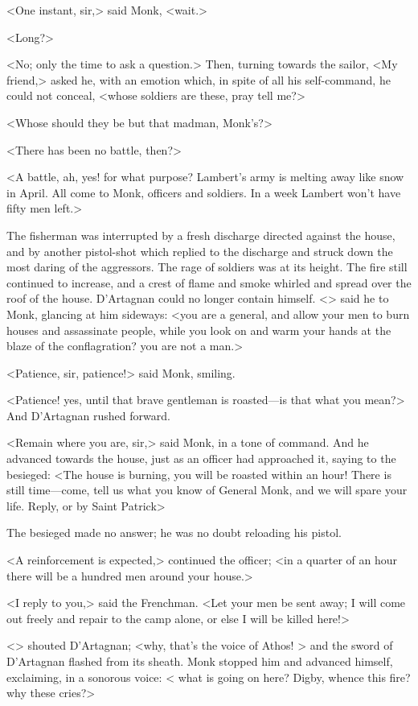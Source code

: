 <One instant, sir,> said Monk, <wait.>

<Long?>

<No; only the time to ask a question.> Then, turning towards the sailor, <My friend,> asked he, with an emotion which, in spite of all his self-command, he could not conceal, <whose soldiers are these, pray tell me?>

<Whose should they be but that madman, Monk's?>

<There has been no battle, then?>

<A battle, ah, yes! for what purpose? Lambert's army is melting away like snow in April. All come to Monk, officers and soldiers. In a week Lambert won't have fifty men left.>

The fisherman was interrupted by a fresh discharge directed against the house, and by another pistol-shot which replied to the discharge and struck down the most daring of the aggressors. The rage of soldiers was at its height. The fire still continued to increase, and a crest of flame and smoke whirled and spread over the roof of the house. D'Artagnan could no longer contain himself. <> said he to Monk, glancing at him sideways: <you are a general, and allow your men to burn houses and assassinate people, while you look on and warm your hands at the blaze of the conflagration?  you are not a man.>

<Patience, sir, patience!> said Monk, smiling.

<Patience! yes, until that brave gentleman is roasted—is that what you mean?> And D'Artagnan rushed forward.

<Remain where you are, sir,> said Monk, in a tone of command. And he advanced towards the house, just as an officer had approached it, saying to the besieged: <The house is burning, you will be roasted within an hour! There is still time—come, tell us what you know of General Monk, and we will spare your life. Reply, or by Saint Patrick\longdash>

The besieged made no answer; he was no doubt reloading his pistol.

<A reinforcement is expected,> continued the officer; <in a quarter of an hour there will be a hundred men around your house.>

<I reply to you,> said the Frenchman. <Let your men be sent away; I will come out freely and repair to the camp alone, or else I will be killed here!>

<> shouted D'Artagnan; <why, that's the voice of Athos! > and the sword of D'Artagnan flashed from its sheath. Monk stopped him and advanced himself, exclaiming, in a sonorous voice: < what is going on here? Digby, whence this fire? why these cries?>

